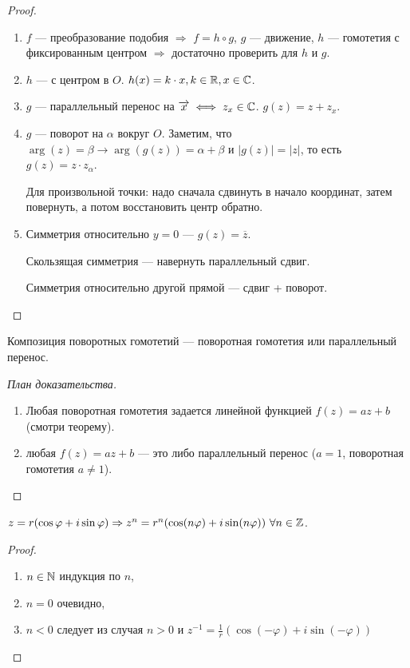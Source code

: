 \begin{proof}
    \slashn
    \begin{enumerate}
        \item $f$ --- преобразование подобия  $\Rightarrow$  $f = h \circ g$,  $g$ --- движение,  $h$ --- гомотетия с фиксированным центром  $\Rightarrow$ достаточно проверить для  $h$ и  $g$. 

        \item $h$ --- с центром в  $O$. $h(x) = k \cdot x, k \in \mathbb{R}, x \in \mathbb{C}$.
        \item $g$ --- параллельный перенос на  $\overrightarrow{x} \iff z_x \in \mathbb{C}$.  $g(z) = z + z_x$.
        \item  $g$ --- поворот на  $\alpha$ вокруг  $O$. Заметим, что  $\arg(z) = \beta \to \arg(g(z)) = \alpha + \beta$ и  $|g(z)| = |z|$, то есть  $g(z) = z \cdot z_\alpha$.

            Для произвольной точки: надо сначала сдвинуть в начало координат, затем повернуть, а потом восстановить центр обратно.
        \item Симметрия относительно  $y=0$ ---  $g(z) = \overline{z}$.

            Скользящая симметрия --- навернуть параллельный сдвиг.

            Симметрия относительно другой прямой --- сдвиг + поворот.
    \end{enumerate}
\end{proof}
\begin{consequence}
    Композиция поворотных гомотетий --- поворотная гомотетия или параллельный перенос.
\end{consequence}
\begin{proof}[План доказательства]
    \slashn
    \begin{enumerate}
        \item Любая поворотная гомотетия задается линейной функцией $f(z) = az + b$ (смотри теорему).
        \item любая $f(z) = az + b$ --- это либо параллельный перенос ($a = 1$, поворотная гомотетия  $a \neq 1$).
    \end{enumerate}
\end{proof}
\begin{theorem}
    $z = r(\cos \varphi + i \sin \varphi) \Rightarrow z^n = r^n(\cos(n\varphi) + i\sin(n\varphi))\ \forall n \in \mathbb{Z}$.
\end{theorem}
\begin{proof}
    \slashn
    \begin{enumerate}
        \item $n \in \mathbb{N}$ индукция по  $n$,
        \item  $n = 0$ очевидно,
        \item  $n < 0$ следует из случая  $n > 0$ и  $z^{-1} = \frac{1}{r}(\cos(-\varphi) + i\sin(-\varphi))$
    \end{enumerate}
\end{proof}
